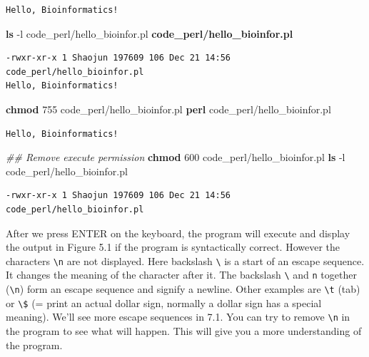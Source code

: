 \documentclass[]{book}
\newenvironment{Shaded}{\begin{snugshade}}{\end{snugshade}}
\newcommand{\KeywordTok}[1]{\textcolor[rgb]{0.13,0.29,0.53}{\textbf{{#1}}}}
\newcommand{\CommentTok}[1]{\textcolor[rgb]{0.56,0.35,0.01}{\textit{{#1}}}}
\newcommand{\NormalTok}[1]{{#1}}
\begin{document}
\begin{verbatim}
Hello, Bioinformatics!
\end{verbatim}

\begin{Shaded}
\begin{Highlighting}[]
\KeywordTok{ls} \NormalTok{-l code_perl/hello_bioinfor.pl}
\KeywordTok{code_perl/hello_bioinfor.pl}
\end{Highlighting}
\end{Shaded}

\begin{verbatim}
-rwxr-xr-x 1 Shaojun 197609 106 Dec 21 14:56 code_perl/hello_bioinfor.pl
Hello, Bioinformatics!
\end{verbatim}

\begin{Shaded}
\begin{Highlighting}[]
\KeywordTok{chmod} \NormalTok{755 code_perl/hello_bioinfor.pl}
\KeywordTok{perl} \NormalTok{code_perl/hello_bioinfor.pl}
\end{Highlighting}
\end{Shaded}

\begin{verbatim}
Hello, Bioinformatics!
\end{verbatim}

\begin{Shaded}
\begin{Highlighting}[]
\CommentTok{## Remove execute permission }
\KeywordTok{chmod} \NormalTok{600 code_perl/hello_bioinfor.pl}
\KeywordTok{ls} \NormalTok{-l code_perl/hello_bioinfor.pl}
\end{Highlighting}
\end{Shaded}

\begin{verbatim}
-rwxr-xr-x 1 Shaojun 197609 106 Dec 21 14:56 code_perl/hello_bioinfor.pl
\end{verbatim}

After we press ENTER on the keyboard, the program will execute and
display the output in Figure 5.1 if the program is syntactically
correct. However the characters \texttt{\textbackslash{}n} are not
displayed. Here backslash \texttt{\textbackslash{}} is a start of an
escape sequence. It changes the meaning of the character after it. The
backslash \texttt{\textbackslash{}} and \texttt{n} together
(\texttt{\textbackslash{}n}) form an escape sequence and signify a
newline. Other examples are \texttt{\textbackslash{}t} (tab) or
\texttt{\textbackslash{}\$} (= print an actual dollar sign, normally a
dollar sign has a special meaning). We'll see more escape sequences in
7.1. You can try to remove \texttt{\textbackslash{}n} in the program to
see what will happen. This will give you a more understanding of the
program.
\end{document}
